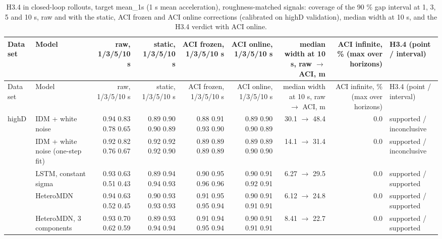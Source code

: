 \begingroup
\footnotesize
\begin{longtable}{llrrrrrrl}
\caption{H3.4 in closed-loop rollouts, target mean\_1s (1 s mean acceleration), roughness-matched signals: coverage of the 90 \% gap interval at 1, 3, 5 and 10 s, raw and with the static, ACI frozen and ACI online corrections (calibrated on highD validation), median width at 10 s, and the H3.4 verdict with ACI online.}\label{tab:t4-coverage--matched--mean-1s} \\
\toprule
Data set & Model & raw, 1/3/5/10 s & static, 1/3/5/10 s & ACI frozen, 1/3/5/10 s & ACI online, 1/3/5/10 s & median width at 10 s, raw $\rightarrow$ ACI, m & ACI infinite, \% (max over horizons) & H3.4 (point / interval) \\
\midrule
\endfirsthead
\toprule
Data set & Model & raw, 1/3/5/10 s & static, 1/3/5/10 s & ACI frozen, 1/3/5/10 s & ACI online, 1/3/5/10 s & median width at 10 s, raw $\rightarrow$ ACI, m & ACI infinite, \% (max over horizons) & H3.4 (point / interval) \\
\midrule
\endhead
\bottomrule
\endlastfoot
highD & IDM + white noise & 0.94 0.83 0.78 0.65 & 0.89 0.90 0.90 0.89 & 0.88 0.91 0.93 0.90 & 0.89 0.90 0.90 0.89 & 30.1 $\rightarrow$ 48.4 & 0.0 & supported / inconclusive \\
 & IDM + white noise (one-step fit) & 0.92 0.82 0.76 0.67 & 0.92 0.92 0.92 0.90 & 0.89 0.89 0.89 0.89 & 0.89 0.89 0.90 0.90 & 14.1 $\rightarrow$ 31.4 & 0.0 & supported / inconclusive \\
 & LSTM, constant sigma & 0.93 0.63 0.51 0.43 & 0.89 0.94 0.94 0.93 & 0.90 0.95 0.96 0.96 & 0.90 0.91 0.92 0.91 & 6.27 $\rightarrow$ 29.5 & 0.0 & supported / supported \\
 & HeteroMDN & 0.94 0.63 0.52 0.45 & 0.90 0.93 0.93 0.93 & 0.91 0.95 0.95 0.94 & 0.90 0.91 0.91 0.91 & 6.12 $\rightarrow$ 24.8 & 0.0 & supported / supported \\
 & HeteroMDN, 3 components & 0.93 0.70 0.62 0.59 & 0.89 0.93 0.94 0.94 & 0.91 0.94 0.95 0.94 & 0.90 0.91 0.91 0.91 & 8.41 $\rightarrow$ 22.7 & 0.0 & supported / supported \\

\end{longtable}
